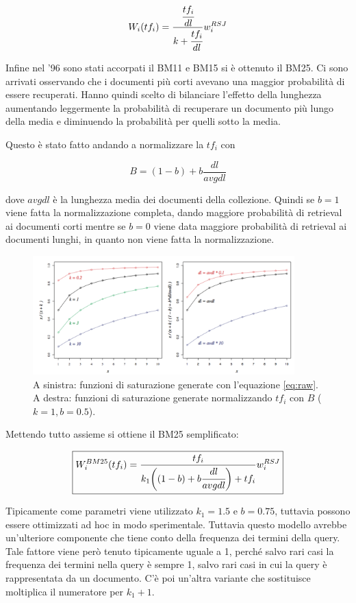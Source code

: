 $$
W_i(tf_i) = \frac{\cfrac{tf_i}{dl}}{k + \cfrac{tf_i}{dl}}  w_i^{RSJ}
$$

Infine nel '96 sono stati accorpati il BM11 e BM15 si è ottenuto il BM25. Ci sono arrivati osservando che i documenti più corti avevano una maggior probabilità di essere recuperati. 
Hanno quindi scelto di bilanciare l'effetto della lunghezza aumentando leggermente la probabilità di recuperare un documento più lungo della media e diminuendo la probabilità per quelli sotto la media.

Questo è stato fatto andando a normalizzare la $tf_i$ con

$$
B = (1-b)+ b\frac{dl}{avgdl}
$$

\noindent dove $avgdl$ è la lunghezza media dei documenti della collezione.
Quindi se $b=1$ viene fatta la normalizzazione completa, dando maggiore probabilità di retrieval ai documenti corti mentre se $b=0$ viene data maggiore probabilità di retrieval ai documenti lunghi, in quanto non viene fatta la normalizzazione.

\begin{figure}[htbp]
	\centering
	\includegraphics[width=0.9\textwidth]{images/l19-fig-2.png}
	\caption{A sinistra: funzioni di saturazione generate con l'equazione \ref{eq:raw}. A destra: funzioni di saturazione generate normalizzando $tf_i$ con $B$ ($k=1, b=0.5$).}
\end{figure}


Mettendo tutto assieme si ottiene il BM25 semplificato: 

\begin{align}
\boxed{
	W_i^{BM25}(tf_i) = \frac{tf_i}{k_1\bigg((1-b)+ b\cfrac{dl}{avgdl}\bigg) + tf_i } w_i^{RSJ}
}
\end{align}

Tipicamente come parametri viene utilizzato $k_1=1.5$ e $b=0.75$, tuttavia possono essere ottimizzati ad hoc in modo sperimentale.
Tuttavia questo modello avrebbe un'ulteriore componente che tiene conto della frequenza dei termini della query. Tale fattore viene però tenuto tipicamente uguale a 1, perché salvo rari casi la frequenza dei termini nella query è sempre 1, salvo rari casi in cui la query è rappresentata da un documento.
C'è poi un'altra variante che sostituisce moltiplica il numeratore per $k_1+1$.

